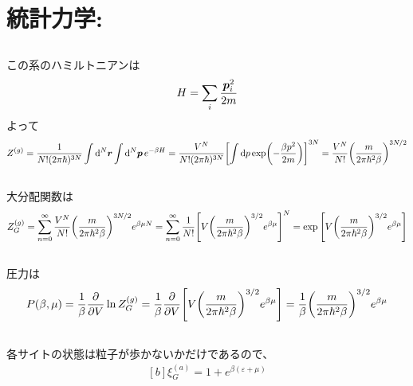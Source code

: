\documentclass[../ap_2020.tex]{subfiles}
\begin{document}
\setcounter{chapter}{2}
\chapter{統計力学: }
\section{}
この系のハミルトニアンは
\begin{equation}\begin{aligned}[b]
    H= \sum_{i}\frac{\vb*{p}_i^2}{2m}
\end{aligned}\end{equation}
よって
\begin{equation}\begin{aligned}[b]
    Z^{(g)} = \frac{1}{N!(2\pi\hbar)^{3N}}\int\dd[N]{\vb*{r}}\int\dd[N]{\vb*{p}}e^{-\beta H}
    = \frac{V^N}{N!(2\pi\hbar)^{3N}}\qty[\int \dd{p} \exp(-\frac{\beta p^2}{2m})]^{3N}
    = \frac{V^N}{N!}\qty(\frac{m}{2\pi\hbar^2 \beta})^{3N/2}
\end{aligned}\end{equation}

\section{}
大分配関数は
\begin{equation}\begin{aligned}[b]
    Z_G^{(g)} = \sum_{n=0}^{\infty} \frac{V^N}{N!}\qty(\frac{m}{2\pi\hbar^2 \beta})^{3N/2} e^{\beta\mu N}
    = \sum_{n=0}^{\infty} \frac{1}{N!}\qty[V\qty(\frac{m}{2\pi\hbar^2 \beta})^{3/2}e^{\beta\mu}]^N
    = \exp\qty[V\qty(\frac{m}{2\pi\hbar^2 \beta})^{3/2}e^{\beta\mu}]
\end{aligned}\end{equation}

\section{}
圧力は
\begin{equation}\begin{aligned}[b]
    P(\beta,\mu) = \frac{1}{\beta}\pdv{V}\ln Z_G^{(g)}
    = \frac{1}{\beta} \pdv{V}\qty[V\qty(\frac{m}{2\pi\hbar^2 \beta})^{3/2}e^{\beta\mu}]
    = \frac{1}{\beta} \qty(\frac{m}{2\pi\hbar^2 \beta})^{3/2}e^{\beta\mu}
\end{aligned}\end{equation}

\section{}
各サイトの状態は粒子が歩かないかだけであるので、
\begin{equation}\begin{aligned}[b]
    \xi_G^{(a)} = 1+ e^{\beta(\varepsilon+\mu)}
\end{aligned}\end{equation}
\end{document}
